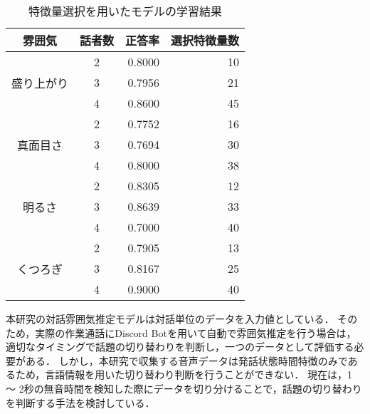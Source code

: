 \begin{table}[t]
    \caption{特徴量選択を用いたモデルの学習結果}
    \centering
    \begin{tabular}{|c|c|r|r|}
        \hline
        雰囲気 & 話者数 & 正答率 & 選択特徴量数 \\
        \hline\hline
        \multirow{3}{*}{盛り上がり} & 2 & 0.8000 & 10 \\
        & 3 & 0.7956 & 21 \\
        & 4 & 0.8600 & 45 \\ \hline
        \multirow{3}{*}{真面目さ} & 2 & 0.7752 & 16 \\
        & 3 & 0.7694 & 30 \\
        & 4 & 0.8000 & 38 \\ \hline
        \multirow{3}{*}{明るさ} & 2 & 0.8305 & 12 \\
        & 3 & 0.8639 & 33 \\
        & 4 & 0.7000 & 40 \\ \hline
        \multirow{3}{*}{くつろぎ} & 2 & 0.7905 & 13 \\
        & 3 & 0.8167 & 25 \\
        & 4 & 0.9000 & 40 \\ \hline
    \end{tabular}
    \label{tab:learn_result_with_ga}
\end{table}

本研究の対話雰囲気推定モデルは対話単位のデータを入力値としている．
そのため，実際の作業通話にDiscord Botを用いて自動で雰囲気推定を行う場合は，適切なタイミングで話題の切り替わりを判断し，一つのデータとして評価する必要がある．
しかし，本研究で収集する音声データは発話状態時間特徴のみであるため，言語情報を用いた切り替わり判断を行うことができない．
現在は，1 〜 2秒の無音時間を検知した際にデータを切り分けることで，話題の切り替わりを判断する手法を検討している． 



